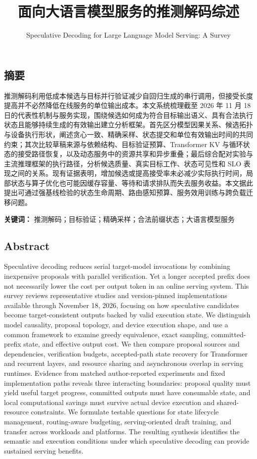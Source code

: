 \documentclass[
  a4paper,
  UTF8,
  fontset=none,
  zihao=5]{ctexart}
\title{面向大语言模型服务的推测解码综述}
\subtitle{Speculative Decoding for Large Language Model Serving: A
Survey}
\author{}
\date{}
\begin{document}
\maketitle

\subsection*{摘要}\label{abstract-zh}

推测解码利用低成本候选与目标并行验证减少自回归生成的串行调用，但接受长度提高并不必然降低在线服务的单位输出成本。本文系统梳理截至
2026 年 11 月 18
日的代表性机制与服务实现，围绕候选如何成为符合目标输出语义、具有合法执行状态且能够持续生成的有效输出建立分析框架。首先区分模型因果关系、候选拓扑与设备执行形状，阐述贪心一致、精确采样、状态提交和单位有效输出时间的共同约束；其次比较草稿来源与依赖结构、目标验证预算、Transformer
KV
与循环状态的接受路径恢复，以及动态服务中的资源共享和异步重叠；最后综合配对实验与主流推理框架的执行路径，分析候选质量、真实目标工作、状态可见性和
SLO
表现之间的关系。现有证据表明，增加候选或提高接受率未必减少实际执行时间，局部状态与算子优化也可能因缓存容量、等待和请求排队而失去服务收益。本文据此提出可通过强基线检验的状态生命周期、路由感知预算、服务效用训练与跨负载迁移问题。

\textbf{关键词：}
推测解码；目标验证；精确采样；合法前缀状态；大语言模型服务

\subsection*{Abstract}\label{abstract-en}

Speculative decoding reduces serial target-model invocations by
combining inexpensive proposals with parallel verification. Yet a longer
accepted prefix does not necessarily lower the cost per output token in
an online serving system. This survey reviews representative studies and
version-pinned implementations available through November 18, 2026,
focusing on how speculative candidates become target-consistent outputs
backed by valid execution state. We distinguish model causality,
proposal topology, and device execution shape, and use a common
framework to examine greedy equivalence, exact sampling,
committed-prefix state, and effective output cost. We then compare
proposal sources and dependencies, verification budgets, accepted-path
state recovery for Transformer and recurrent layers, and resource
sharing and asynchronous overlap in serving runtimes. Evidence from
matched author-reported experiments and fixed implementation paths
reveals three interacting boundaries: proposal quality must yield useful
target progress, committed outputs must have consumable state, and local
computational savings must survive actual device execution and
shared-resource constraints. We formulate testable questions for state
lifecycle management, routing-aware budgeting, serving-oriented draft
training, and transfer across workloads and platforms. The resulting
synthesis identifies the semantic and execution conditions under which
speculative decoding can provide sustained serving benefits.
\end{document}
